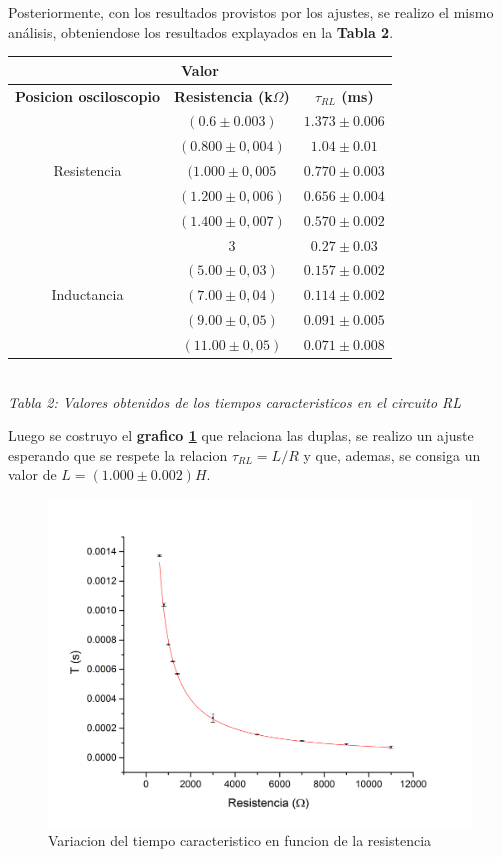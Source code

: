 \documentclass[11pt,a4paper]{article}
\begin{document}
Posteriormente, con los resultados provistos por los ajustes, se realizo el mismo análisis, obteniendose los resultados explayados en la \textbf{Tabla 2}.

\begin{center}
\begin{tabular}{||c|c|c||}
\hline
\multicolumn{3}{||c||}{\textbf{Valor}} \\ \hline
\textbf{Posicion osciloscopio} & \textbf{Resistencia (k$\Omega$)} & \textbf{$\tau_{RL}$ (ms)}\\ \hline 
\multirow {5}{2cm}{Resistencia} & $(0.6\pm0.003)$ & $1.373 \pm 0.006$ \\ \cline {2-3}
& $(0.800\pm0,004)$ & $1.04\pm 0.01$ \\ \cline {2-3} 
& $(1.000\pm0,005$ & $0.770 \pm 0.003$ \\ \cline {2-3}
& $(1.200\pm0,006)$ & $0.656 \pm 0.004$ \\ \cline {2-3}
& $(1.400\pm0,007)$ & $0.570 \pm 0.002$ \\ \hline
\multirow {5}{2cm}{Inductancia} & $3$ & $0.27 \pm 0.03$ \\ \cline {2-3}
& $(5.00\pm0,03)$ & $0.157 \pm 0.002$ \\ \cline {2-3}
& $(7.00\pm0,04)$ & $0.114 \pm 0.002$ \\ \cline {2-3}
& $(9.00\pm0,05)$ & $0.091 \pm 0.005$ \\ \cline {2-3} 
& $(11.00\pm0,05)$ & $0.071 \pm 0.008$ \\ \hline
\end{tabular}\\[0.3cm]

 \textit{Tabla 2: Valores obtenidos de los tiempos caracteristicos en el circuito RL}
\end{center}

Luego se costruyo el \textbf{grafico \ref{fig:T-RL}} que relaciona las duplas, se realizo un ajuste esperando que se respete la relacion $\tau_{RL} = L/R$ y que, ademas, se consiga un valor de $L = (1.000 \pm 0.002) H$.

\begin{figure}[H]
\centering
\includegraphics[scale=0.45]{TauRCvsR_Todo_en_Serie}
  \caption{Variacion del tiempo caracteristico en funcion de la resistencia}
  \label{fig:T-RL}
\end{figure}
\end{document}
